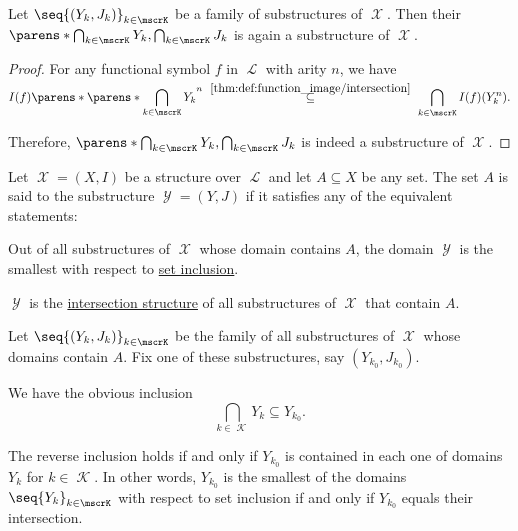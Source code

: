 \begin{proposition}\label{thm:intersection_structure}
  Let \( \seq{ (Y_k, J_k) }_{k \in \mscrK} \) be a family of substructures of \( \mscrX \). Then their  \( \parens*{\bigcap_{k \in \mscrK} Y_k, \bigcap_{k \in \mscrK} J_k} \) is again a substructure of \( \mscrX \).
\end{proposition}
\begin{proof}
  For any functional symbol \( f \) in \( \mscrL \) with arity \( n \), we have
  \begin{equation*}
    I(f)\parens*{\parens*{\bigcap_{\smash{k \in \mscrK}} Y_k}^n}
    \reloset {\ref{thm:def:function_image/intersection}} \subseteq
    \bigcap_{k \in \mscrK} I(f)(Y_k^n).
  \end{equation*}

  Therefore, \( \parens*{\bigcap_{k \in \mscrK} Y_k, \bigcap_{k \in \mscrK} J_k} \) is indeed a substructure of \( \mscrX \).
\end{proof}

\begin{definition}\label{def:first_order_generated_substructure}\mimprovised
  Let \( \mscrX = (X, I) \) be a structure over \( \mscrL \) and let \( A \subseteq X \) be any set. The set \( A \) is said to  the substructure \( \mscrY = (Y, J) \) if it satisfies any of the equivalent statements:
  \begin{thmenum}
     Out of all substructures of \( \mscrX \) whose domain contains \( A \), the domain \( \mscrY \) is the smallest with respect to \hyperref[def:subset]{set inclusion}.

     \( \mscrY \) is the \hyperref[thm:intersection_structure]{intersection structure} of all substructures of \( \mscrX \) that contain \( A \).
  \end{thmenum}
\end{definition}
\begin{defproof}
   Let \( \seq{ (Y_k, J_k) }_{k \in \mscrK} \) be the family of all substructures of \( \mscrX \) whose domains contain \( A \). Fix one of these substructures, say \( (Y_{k_0}, J_{k_0}) \).

  We have the obvious inclusion
  \begin{equation*}
    \bigcap_{k \in \mscrK} Y_k \subseteq Y_{k_0}.
  \end{equation*}

  The reverse inclusion holds if and only if \( Y_{k_0} \) is contained in each one of domains \( Y_k \) for \( k \in \mscrK \). In other words, \( Y_{k_0} \) is the smallest of the domains \( \seq{ Y_k }_{k \in \mscrK} \) with respect to set inclusion if and only if \( Y_{k_0} \) equals their intersection.
\end{defproof}

